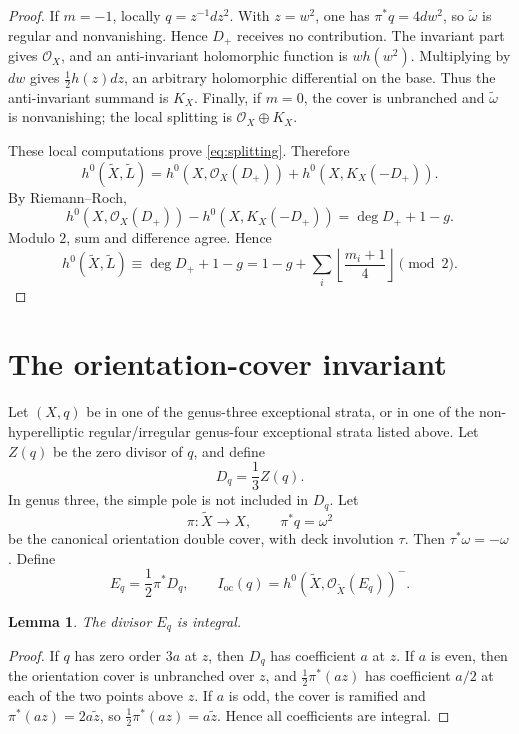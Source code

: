 \documentclass[11pt]{article}
\newtheorem{lemma}[theorem]{Lemma}
\theoremstyle{remark}
\newcommand{\Xt}{\widetilde X}
\newcommand{\Lt}{\widetilde L}
\newcommand{\wt}{\widetilde\omega}
\newcommand{\OO}{\mathcal O}
\newcommand{\Ioc}{I_{\mathrm{oc}}}
\begin{document}
\begin{proof}
If $m=-1$, locally $q=z^{-1}dz^2$. With $z=w^2$, one has $\pi^*q=4dw^2$, so $\wt$ is regular and nonvanishing.
Hence $D_+$ receives no contribution. The invariant part gives $\OO_X$, and an anti-invariant
holomorphic function is $wh(w^2)$. Multiplying by $dw$ gives $\frac12 h(z)dz$, an arbitrary holomorphic
differential on the base. Thus the anti-invariant summand is $K_X$. Finally, if $m=0$, the cover is
unbranched and $\wt$ is nonvanishing; the local splitting is $\OO_X\oplus K_X$.

These local computations prove \eqref{eq:splitting}. Therefore
\[
h^0(\Xt,\Lt)=h^0(X,\OO_X(D_+))+h^0(X,K_X(-D_+)).
\]
By Riemann--Roch,
\[
h^0(X,\OO_X(D_+))-h^0(X,K_X(-D_+))=\deg D_++1-g.
\]
Modulo $2$, sum and difference agree. Hence
\[
h^0(\Xt,\Lt)\equiv\deg D_++1-g
=1-g+\sum_i\left\lfloor\frac{m_i+1}{4}\right\rfloor\pmod 2.
\]
\end{proof}

\section{The orientation-cover invariant}
Let $(X,q)$ be in one of the genus-three exceptional strata, or in one of the non-hyperelliptic
regular/irregular genus-four exceptional strata listed above. Let $Z(q)$ be the zero divisor of $q$,
and define
\[
D_q=\frac13 Z(q).
\]
In genus three, the simple pole is not included in $D_q$. Let
\[
\pi:\Xt\longrightarrow X,\qquad \pi^*q=\omega^2
\]
be the canonical orientation double cover, with deck involution $\tau$. Then $\tau^*\omega=-\omega$. Define
\[
E_q=\frac12\pi^*D_q,\qquad \Ioc(q)=h^0(\Xt,\OO_{\Xt}(E_q))^-.
\]

\begin{lemma}\label{lem:integral}
The divisor $E_q$ is integral.
\end{lemma}
\begin{proof}
If $q$ has zero order $3a$ at $z$, then $D_q$ has coefficient $a$ at $z$. If $a$ is even, then the orientation
cover is unbranched over $z$, and $\frac12\pi^*(az)$ has coefficient $a/2$ at each of the two points above $z$.
If $a$ is odd, the cover is ramified and $\pi^*(az)=2a\widetilde z$, so $\frac12\pi^*(az)=a\widetilde z$. Hence all coefficients are
integral.
\end{proof}
\end{document}
